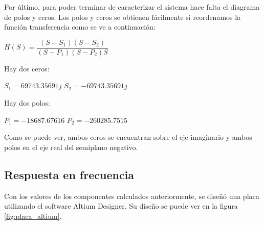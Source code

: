 Por último, para poder terminar de caracterizar el sistema hace falta el diagrama de polos y ceros. Los polos y ceros se obtienen fácilmente si reordenamos la función transferencia como se ve a continuación:

\begin{center}
    $H(S) = \dfrac{(S-S_{1})(S-S_{2})}{(S-P_{1})(S-P_{2})S}$  \\
\end{center}

Hay dos ceros:
\begin{center}
    $S_{1}=69743.35691j $
    $S_{2}=-69743.35691j $
    \end{center}

Hay dos polos:

\begin{center}
    $P_{1}=-18687.67616$
    $P_{2}=-260285.7515$
\end{center}

Como se puede ver, ambos ceros se encuentran sobre el eje imaginario y ambos polos en el eje real del semiplano negativo.


\begin{center}
    \end{center}

\subsection{Respuesta en frecuencia}
Con los valores de los componentes calculados anteriormente, se diseñó una placa utilizando el software Altium Designer. Su diseño se 
puede ver en la figura \ref{fig:placa_altium}.

